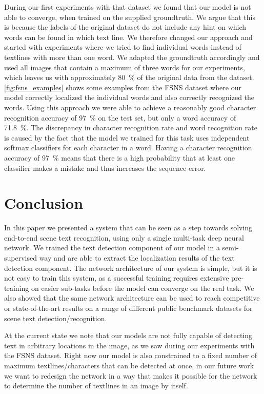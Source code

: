 \documentclass[10pt,twocolumn,letterpaper]{article}
\begin{document}
During our first experiments with that dataset we found that our model is not able to converge, when trained on the supplied groundtruth. We argue that this is because the labels of the original dataset do not include any hint on which words can be found in which text line.
We therefore changed our approach and started with experiments where we tried to find individual words instead of textlines with more than one word.
We adapted the groundtruth accordingly and used all images that contain a maximum of three words for our experiments, which leaves us with approximately \SI{80}{\percent} of the original data from the dataset.
\autoref{fig:fsns_examples} shows some examples from the \ac{FSNS} dataset where our model correctly localized the individual words and also correctly recognized the words.
Using this approach we were able to achieve a reasonably good character recognition accuracy of \SI{97}{\percent} on the test set, but only a word accuracy of \SI{71.8}{\percent}.
The discrepancy in character recognition rate and word recognition rate is caused by the fact that the model we trained for this task uses independent softmax classifiers for each character in a word.
Having a character recognition accuracy of \SI{97}{\percent} means that there is a high probability that at least one classifier makes a mistake and thus increases the sequence error.



 		
	\section{Conclusion}
\label{sec:conclusion}

In this paper we presented a system that can be seen as a step towards solving end-to-end scene text recognition, using only a single multi-task deep neural network.
We trained the text detection component of our model in a semi-supervised way and are able to extract the localization results of the text detection component.
The network architecture of our system is simple, but it is not easy to train this system, as a successful training requires extensive pre-training on easier sub-tasks before the model can converge on the real task.
We also showed that the same network architecture can be used to reach competitive or state-of-the-art results on a range of different public benchmark datasets for scene text detection/recognition.

At the current state we note that our models are not fully capable of detecting text in arbitrary locations in the image, as we saw during our experiments with the \ac{FSNS} dataset.
Right now our model is also constrained to a fixed number of maximum textlines/characters that can be detected at once, in our future work we want to redesign the network in a way that makes it possible for the network to determine the number of textlines in an image by itself.

%
 
	{\small
		
		
	}
\end{document}
